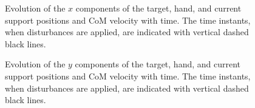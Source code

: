 \begin{figure}[!htbp]
    \begin{minipage}[t]{\textwidth}
    \end{minipage}
    \hfill
    \begin{minipage}[t]{\textwidth}
    \end{minipage}
    \caption[Reaction to disturbances and changes of the target position ($x$ components).]{
        Evolution of the $x$ components of the target, hand, and current
        support positions and \ac{CoM} velocity with time. The time instants,
        when disturbances are applied, are indicated with vertical dashed black
        lines.
    }
    \label{fig.task_walk_x}
\end{figure}


\begin{figure}[!htbp]
    \begin{minipage}[t]{\textwidth}
    \end{minipage}
    \hfill
    \begin{minipage}[t]{\textwidth}
    \end{minipage}
    \caption[Reaction to disturbances and changes of the target position ($y$ components).]{
        Evolution of the $y$ components of the target, hand, and current
        support positions and \ac{CoM} velocity with time. The time instants,
        when disturbances are applied, are indicated with vertical dashed black
        lines.
    }
    \label{fig.task_walk_y}
\end{figure}


